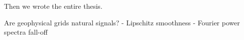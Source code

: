 \documentclass[manuscript.tex]{subfiles}
\begin{document}
Then we wrote the entire thesis.

Are geophysical grids natural signals?
-   Lipschitz smoothness
-   Fourier power spectra fall-off
\end{document}
